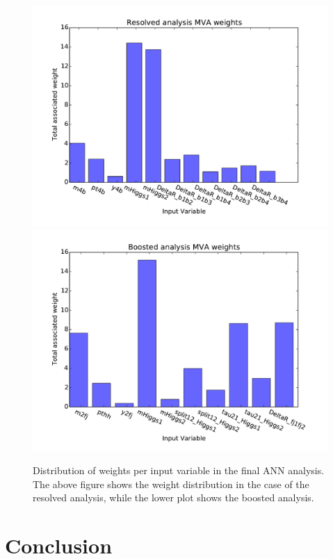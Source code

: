 \documentclass[12pt]{article}
\begin{document}
\begin{figure}[h]
\begin{center}
\includegraphics[width=1\textwidth]{plots/nnweights_res.pdf}
\includegraphics[width=1\textwidth]{plots/nnweights_boost.pdf}
\caption{Distribution of weights per input variable in the final ANN analysis. The above figure shows the weight distribution in the case of the resolved analysis, while the lower plot shows the boosted analysis.}
\label{fig:nnweights}
\end{center}
\end{figure}


\section{Conclusion}
\end{document}
